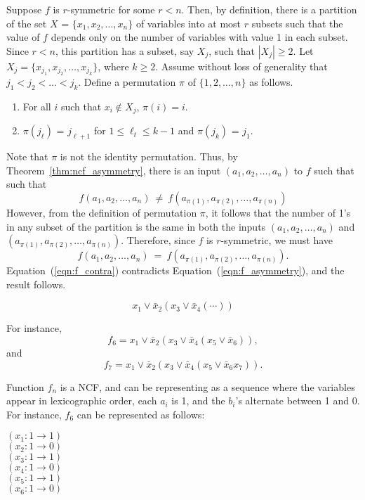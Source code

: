 Suppose $f$ is $r$-symmetric for some $r < n$.
Then, by definition, there is a partition of the set $X$ =
$\{x_1, x_2, \ldots, x_n\}$ of variables into at most $r$ subsets such that
the value of $f$ depends only on the number of variables with value 1
in each subset.
Since $r < n$, this partition has a subset, say $X_j$, 
such that $|X_j| \geq 2$.
Let $X_j = \{x_{j_1}, x_{j_2}, \ldots, x_{j_k}\}$, where $k \geq 2$.
Assume without loss of generality that $j_1 < j_2 < \ldots < j_k$.
Define a permutation $\pi$ of $\{1, 2, \ldots, n\}$ as follows. 
\begin{enumerate}
\item For all $i$ such that $x_i \not\in X_j$, $\pi(i) = i$.
\item $\pi(j_{\ell})$ = $j_{\ell+1}$ for $1 \leq \ell_t \leq k-1$
      and $\pi(j_{k})$ = $j_1$. 
\end{enumerate}
Note that $\pi$ is not the identity permutation.
Thus, by Theorem~\ref{thm:ncf_asymmetry},
there is an input $(a_1, a_2, \ldots, a_n)$ to $f$ such that
such that
\begin{equation}\label{eqn:f_asymmetry}
f(a_1, a_2, \ldots, a_n) ~\neq~  f(a_{\pi(1)}, a_{\pi(2)}, \ldots, a_{\pi(n)})
\end{equation}
However, from the definition of permutation $\pi$, it follows
that the number of 1's in any subset of the partition 
is the same in both the inputs
$(a_1, a_2, \ldots, a_n)$ and
$(a_{\pi(1)}, a_{\pi(2)}, \ldots, a_{\pi(n)})$.
Therefore, since $f$ is $r$-symmetric, we must have
\begin{equation}\label{eqn:f_contra}
f(a_1, a_2, \ldots, a_n) ~=~ f(a_{\pi(1)}, a_{\pi(2)}, \ldots, a_{\pi(n)}).
\end{equation}
Equation~(\ref{eqn:f_contra}) contradicts 
Equation~(\ref{eqn:f_asymmetry}), and the result follows. \QED
\fi


\iffalse
$$x_1 \vee \bar{x}_2 ( x_3 \vee \bar{x}_4 (\cdots  ) )$$

For instance,
$$f_6 = x_1 \vee \bar{x}_2 ( x_3 \vee \bar{x}_4 ( x_5 \vee \bar{x}_6  ) ),$$
and
$$f_7 = x_1 \vee \bar{x}_2 ( x_3 \vee \bar{x}_4 ( x_5 \vee \bar{x}_6   x_7) ).$$

Function $f_n$ is a NCF, 
and can be representing as a sequence where the variables appear in lexicographic order,
each $a_i$ is 1, and the $b_i$'s alternate between 1 and 0.
For instance, $f_6$ can be represented as follows:

\noindent
$(x_1: 1 \rightarrow 1 )$ \\
$(x_2: 1 \rightarrow 0 )$ \\
$(x_3: 1 \rightarrow 1 )$ \\
$(x_4: 1 \rightarrow 0 )$ \\
$(x_5: 1 \rightarrow 1 )$ \\
$(x_6: 1 \rightarrow 0 )$ \\


